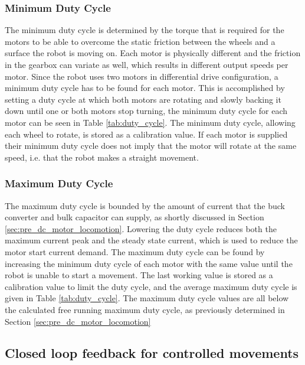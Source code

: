 \subsubsection{Minimum Duty Cycle}

The minimum duty cycle is determined by the torque that is required for the motors to be able to overcome the static friction between the wheels and a surface the robot is moving on.
Each motor is physically different and the friction in the gearbox can variate as well, which results in different output speeds per motor.
Since the robot uses two motors in differential drive configuration, a minimum duty cycle has to be found for each motor.
This is accomplished by setting a duty cycle at which both motors are rotating and slowly backing it down until one or both motors stop turning, the minimum duty cycle for each motor can be seen in Table \ref{tab:duty_cycle}.
The minimum duty cycle, allowing each wheel to rotate, is stored as a calibration value.
If each motor is supplied their minimum duty cycle does not imply that the motor will rotate at the same speed, i.e. that the robot makes a straight movement.

\subsubsection{Maximum Duty Cycle}

The maximum duty cycle is bounded by the amount of current that the buck converter and bulk capacitor can supply, as shortly discussed in Section \ref{sec:pre_dc_motor_locomotion}.
Lowering the duty cycle reduces both the maximum current peak and the steady state current, which is used to reduce the motor start current demand.
The maximum duty cycle can be found by increasing the minimum duty cycle of each motor with the same value until the robot is unable to start a movement.
The last working value is stored as a calibration value to limit the duty cycle, and the average maximum duty cycle is given in Table \ref{tab:duty_cycle}.
The maximum duty cycle values are all below the calculated free running maximum duty cycle, as previously determined in Section \ref{sec:pre_dc_motor_locomotion}


\subsection{Closed loop feedback for controlled movements}

